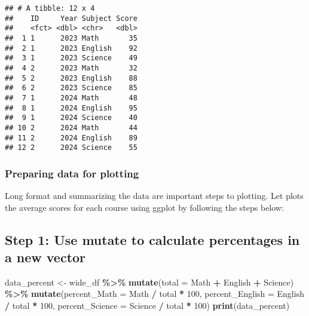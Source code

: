 \documentclass[
]{article}
\newenvironment{Shaded}{\begin{snugshade}}{\end{snugshade}}
\newcommand{\AttributeTok}[1]{\textcolor[rgb]{0.13,0.29,0.53}{#1}}
\newcommand{\DecValTok}[1]{\textcolor[rgb]{0.00,0.00,0.81}{#1}}
\newcommand{\FunctionTok}[1]{\textcolor[rgb]{0.13,0.29,0.53}{\textbf{#1}}}
\newcommand{\NormalTok}[1]{#1}
\newcommand{\OtherTok}[1]{\textcolor[rgb]{0.56,0.35,0.01}{#1}}
\newcommand{\SpecialCharTok}[1]{\textcolor[rgb]{0.81,0.36,0.00}{\textbf{#1}}}
\begin{document}
\begin{verbatim}
## # A tibble: 12 x 4
##    ID     Year Subject Score
##    <fct> <dbl> <chr>   <dbl>
##  1 1      2023 Math       35
##  2 1      2023 English    92
##  3 1      2023 Science    49
##  4 2      2023 Math       32
##  5 2      2023 English    88
##  6 2      2023 Science    85
##  7 1      2024 Math       48
##  8 1      2024 English    95
##  9 1      2024 Science    40
## 10 2      2024 Math       44
## 11 2      2024 English    89
## 12 2      2024 Science    55
\end{verbatim}

\hypertarget{preparing-data-for-plotting}{%
\subsubsection{Preparing data for
plotting}\label{preparing-data-for-plotting}}

Long format and summarizing the data are important steps to plotting.
Let plots the average scores for each course using ggplot by following
the steps below:

\hypertarget{step-1-use-mutate-to-calculate-percentages-in-a-new-vector}{%
\subsection{Step 1: Use mutate to calculate percentages in a new
vector}\label{step-1-use-mutate-to-calculate-percentages-in-a-new-vector}}

\begin{Shaded}
\begin{Highlighting}[]
\NormalTok{data\_percent }\OtherTok{\textless{}{-}}\NormalTok{ wide\_df }\SpecialCharTok{\%\textgreater{}\%}
  \FunctionTok{mutate}\NormalTok{(}\AttributeTok{total =}\NormalTok{ Math }\SpecialCharTok{+}\NormalTok{ English }\SpecialCharTok{+}\NormalTok{ Science) }\SpecialCharTok{\%\textgreater{}\%}
  \FunctionTok{mutate}\NormalTok{(}\AttributeTok{percent\_Math =}\NormalTok{ Math }\SpecialCharTok{/}\NormalTok{ total }\SpecialCharTok{*} \DecValTok{100}\NormalTok{,}
         \AttributeTok{percent\_English =}\NormalTok{ English }\SpecialCharTok{/}\NormalTok{ total }\SpecialCharTok{*} \DecValTok{100}\NormalTok{,}
         \AttributeTok{percent\_Science =}\NormalTok{ Science }\SpecialCharTok{/}\NormalTok{ total }\SpecialCharTok{*} \DecValTok{100}\NormalTok{)}
\FunctionTok{print}\NormalTok{(data\_percent)}
\end{Highlighting}
\end{Shaded}
\end{document}
